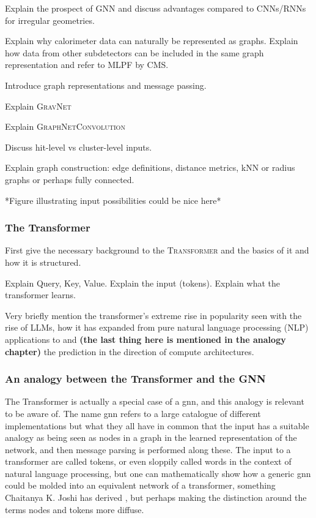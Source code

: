Explain the prospect of GNN and discuss advantages compared to CNNs/RNNs for irregular geometries.

Explain why calorimeter data can naturally be represented as graphs. Explain how data from other subdetectors can be included in the same graph representation and refer to MLPF by CMS.

Introduce graph representations and message passing.

Explain \textsc{GravNet}

Explain \textsc{GraphNetConvolution} \cite{qasim2019-gravnet}

Discuss hit-level vs cluster-level inputs.

Explain graph construction: edge definitions, distance metrics, kNN or radius graphs or perhaps fully connected.

*Figure illustrating input possibilities could be nice here*

\subsubsection{The Transformer}

First give the necessary background to the \textsc{Transformer} and the basics of it and how it is structured.

Explain Query, Key, Value. Explain the input (tokens). Explain what the transformer learns. 

Very briefly mention the transformer's extreme rise in popularity seen with the rise of LLMs, how it has expanded from pure natural language processing (NLP) applications to and \textbf{(the last thing here is mentioned in the analogy chapter)} the prediction in the direction of compute architectures.


\subsubsection{An analogy between the Transformer and the GNN}

The Transformer is actually a special case of a \gls{gnn}, and this analogy is relevant to be aware of. The name \gls{gnn} refers to a large catalogue of different implementations but what they all have in common that the input has a suitable analogy as being seen as nodes in a graph in the learned representation of the network, and then message parsing is performed along these. The input to a transformer are called tokens, or even sloppily called words in the context of natural language processing, but one can mathematically show how a generic \gls{gnn} could be molded into an equivalent network of a transformer, something Chaitanya K. Joshi has derived \cite{joshi2025transformersgnn}, but perhaps making the distinction around the terms nodes and tokens more diffuse. 

